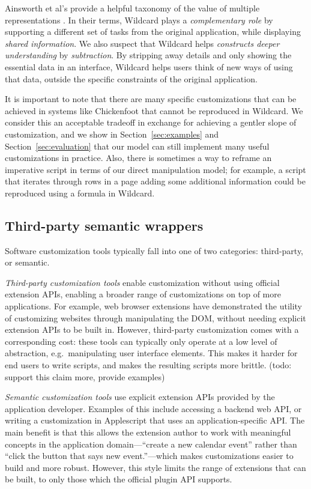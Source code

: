 \documentclass[sigplan,10pt,anonymous,review]{acmart}
\begin{document}
Ainsworth et al's provide a helpful taxonomy of the value of multiple
representations \citep{ainsworth1999}. In their terms, Wildcard plays a
\emph{complementary role} by supporting a different set of tasks from
the original application, while displaying \emph{shared information}. We
also suspect that Wildcard helps \emph{constructs deeper understanding}
by \emph{subtraction}. By stripping away details and only showing the
essential data in an interface, Wildcard helps users think of new ways
of using that data, outside the specific constraints of the original
application.

It is important to note that there are many specific customizations that
can be achieved in systems like Chickenfoot \citep{bolin2005} that
cannot be reproduced in Wildcard. We consider this an acceptable
tradeoff in exchange for achieving a gentler slope of customization, and
we show in Section~\ref{sec:examples} and Section~\ref{sec:evaluation}
that our model can still implement many useful customizations in
practice. Also, there is sometimes a way to reframe an imperative script
in terms of our direct manipulation model; for example, a script that
iterates through rows in a page adding some additional information could
be reproduced using a formula in Wildcard.

\hypertarget{third-party-semantic-wrappers}{%
\subsection{Third-party semantic
wrappers}\label{third-party-semantic-wrappers}}

Software customization tools typically fall into one of two categories:
third-party, or semantic.

\emph{Third-party customization tools} enable customization without
using official extension APIs, enabling a broader range of
customizations on top of more applications. For example, web browser
extensions have demonstrated the utility of customizing websites through
manipulating the DOM, without needing explicit extension APIs to be
built in. However, third-party customization comes with a corresponding
cost: these tools can typically only operate at a low level of
abstraction, e.g.~manipulating user interface elements. This makes it
harder for end users to write scripts, and makes the resulting scripts
more brittle. (todo: support this claim more, provide examples)

\emph{Semantic customization tools} use explicit extension APIs provided
by the application developer. Examples of this include accessing a
backend web API, or writing a customization in Applescript that uses an
application-specific API. The main benefit is that this allows the
extension author to work with meaningful concepts in the application
domain---``create a new calendar event'' rather than ``click the button
that says new event.''---which makes customizations easier to build and
more robust. However, this style limits the range of extensions that can
be built, to only those which the official plugin API supports.
\end{document}
